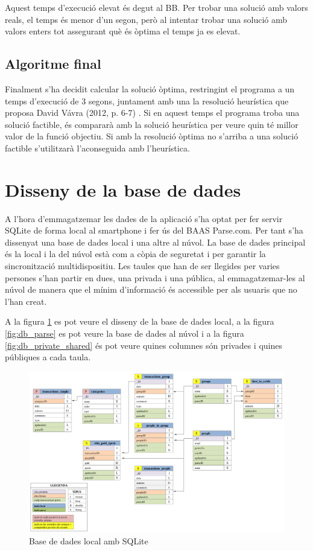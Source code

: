 Aquest temps d'execució elevat és degut al \gls{BB}. Per trobar una solució amb valors reals, el temps és menor d'un segon, però al intentar trobar una solució amb valors enters tot assegurant què és òptima el temps ja es elevat.

\subsection{Algoritme final}
Finalment s'ha decidit calcular la solució òptima, restringint el programa a un temps d'execució de 3 segons, juntament amb una la resolució heurística que proposa David Vávra (2012, p. 6-7) \cite{Settle_up}. Si en aquest temps el programa troba una solució factible, és compararà amb la solució heurística per veure quin té millor valor de la funció objectiu. Si amb la resolució òptima no s'arriba a una solució factible s'utilitzarà l'aconseguida amb l'heurística. 

\section{Disseny de la base de dades}
A l'hora d'emmagatzemar les dades de la aplicació s'ha optat per fer servir \gls{SQLite} de forma local al \gls{smartphone} i fer ús del \gls{BAAS} Parse.com. Per tant s'ha dissenyat una base de dades local i una altre al núvol. La base de dades principal és la local i la del núvol està com a còpia de seguretat i per garantir la sincronització multidispositiu. Les taules que han de ser llegides per varies persones s'han partir en dues, una privada i una pública, al emmagatzemar-les al núvol de manera que el mínim d'informació és accessible per als usuaris que no l'han creat.

A la figura \ref{fig:db_sqlite} es pot veure el disseny de la base de dades local, a la figura \ref{fig:db_parse} es pot veure la base de dades al núvol i a la figura \ref{fig:db_private_shared} és pot veure quines columnes són privades i quines públiques a cada taula. 

\begin{figure}[ht]
\centering
\includegraphics[scale=0.48]{db_sqlite.png}
\caption{Base de dades local amb SQLite}\label{fig:db_sqlite}
\end{figure}

